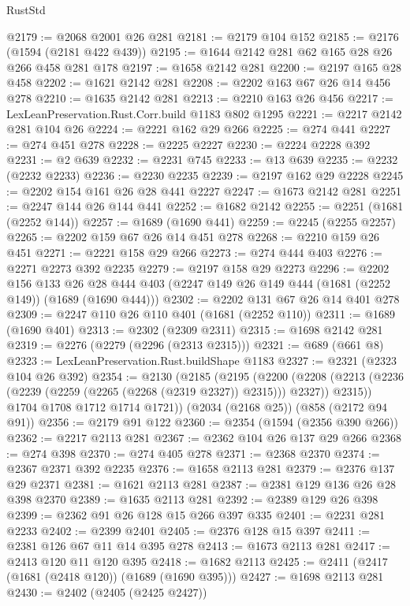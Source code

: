 \begin{lexlean}{RustStd}
\begin{coremodule}
@2179 := @2068 @2001 @26 @281
@2181 := @2179 @104 @152
@2185 := @2176 (@1594 (@2181 @422 @439))
@2195 := @1644 @2142 @281 @62 @165 @28 @26 @266 @458 @281 @178
@2197 := @1658 @2142 @281
@2200 := @2197 @165 @28 @458
@2202 := @1621 @2142 @281
@2208 := @2202 @163 @67 @26 @14 @456 @278
@2210 := @1635 @2142 @281
@2213 := @2210 @163 @26 @456
@2217 := LexLeanPreservation.Rust.Corr.build @1183 @802 @1295
@2221 := @2217 @2142 @281 @104 @26
@2224 := @2221 @162 @29 @266
@2225 := @274 @441
@2227 := @274 @451 @278
@2228 := @2225 @2227
@2230 := @2224 @2228 @392
@2231 := @2 @639
@2232 := @2231 @745
@2233 := @13 @639
@2235 := @2232 (@2232 @2233)
@2236 := @2230 @2235
@2239 := @2197 @162 @29 @2228
@2245 := @2202 @154 @161 @26 @28 @441 @2227
@2247 := @1673 @2142 @281
@2251 := @2247 @144 @26 @144 @441
@2252 := @1682 @2142
@2255 := @2251 (@1681 (@2252 @144))
@2257 := @1689 (@1690 @441)
@2259 := @2245 (@2255 @2257)
@2265 := @2202 @159 @67 @26 @14 @451 @278
@2268 := @2210 @159 @26 @451
@2271 := @2221 @158 @29 @266
@2273 := @274 @444 @403
@2276 := @2271 @2273 @392 @2235
@2279 := @2197 @158 @29 @2273
@2296 := @2202
    @156
    @133
    @26
    @28
    @444
    @403
    (@2247 @149 @26 @149 @444 (@1681 (@2252 @149)) (@1689 (@1690 @444)))
@2302 := @2202 @131 @67 @26 @14 @401 @278
@2309 := @2247 @110 @26 @110 @401 (@1681 (@2252 @110))
@2311 := @1689 (@1690 @401)
@2313 := @2302 (@2309 @2311)
@2315 := @1698 @2142 @281
@2319 := @2276 (@2279 (@2296 (@2313 @2315)))
@2321 := @689 (@661 @8)
@2323 := LexLeanPreservation.Rust.buildShape @1183
@2327 := @2321 (@2323 @104 @26 @392)
@2354 := @2130
    (@2185
      (@2195
        (@2200
          (@2208 (@2213 (@2236 (@2239 (@2259 (@2265 (@2268 (@2319 @2327)) @2315))) @2327)) @2315))
        @1704
        @1708
        @1712
        @1714
        @1721))
    (@2034 (@2168 @25))
    (@858 (@2172 @94 @91))
@2356 := @2179 @91 @122
@2360 := @2354 (@1594 (@2356 @390 @266))
@2362 := @2217 @2113 @281
@2367 := @2362 @104 @26 @137 @29 @266
@2368 := @274 @398
@2370 := @274 @405 @278
@2371 := @2368 @2370
@2374 := @2367 @2371 @392 @2235
@2376 := @1658 @2113 @281
@2379 := @2376 @137 @29 @2371
@2381 := @1621 @2113 @281
@2387 := @2381 @129 @136 @26 @28 @398 @2370
@2389 := @1635 @2113 @281
@2392 := @2389 @129 @26 @398
@2399 := @2362 @91 @26 @128 @15 @266 @397 @335
@2401 := @2231 @281 @2233
@2402 := @2399 @2401
@2405 := @2376 @128 @15 @397
@2411 := @2381 @126 @67 @11 @14 @395 @278
@2413 := @1673 @2113 @281
@2417 := @2413 @120 @11 @120 @395
@2418 := @1682 @2113
@2425 := @2411 (@2417 (@1681 (@2418 @120)) (@1689 (@1690 @395)))
@2427 := @1698 @2113 @281
@2430 := @2402 (@2405 (@2425 @2427))

\end{coremodule}
\end{lexlean}
